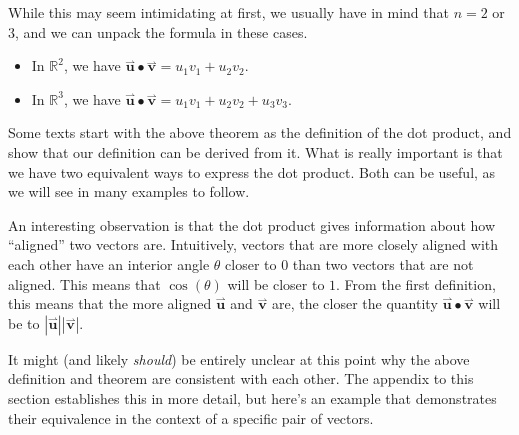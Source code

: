 \documentclass{ximera}
\begin{document}
While this may seem intimidating at first, we usually have in mind that $n=2$ or $3$, and we can unpack the formula in these cases.  

\begin{itemize}
\item In $\mathbb{R}^2$, we have $\overset{\boldsymbol{\rightharpoonup}}{\mathbf{u}} \bullet \overset{\boldsymbol{\rightharpoonup}}{\mathbf{v}} = u_1v_1+u_2v_2$.
\item In $\mathbb{R}^3$, we have $\overset{\boldsymbol{\rightharpoonup}}{\mathbf{u}} \bullet\overset{\boldsymbol{\rightharpoonup}}{\mathbf{v}} = u_1v_1+u_2v_2+u_3v_3$.
\end{itemize}

Some texts start with the above theorem as the definition of the dot product, and show that our definition can be derived from it.  What is really important is that we have two equivalent ways to express the dot product.  Both can be useful, as we will see in many examples to follow.

\begin{remark}
An interesting observation is that the dot product gives information about how ``aligned'' two vectors are.  Intuitively, vectors that are more closely aligned with each other have an interior angle $\theta$ closer to $0$ than two vectors that are not aligned.  This means that $\cos(\theta)$ will be closer to $1$. From the first definition, this means that the more aligned $\overset{\boldsymbol{\rightharpoonup}}{\mathbf{u}}$ and $\overset{\boldsymbol{\rightharpoonup}}{\mathbf{v}}$ are, the closer the quantity $\overset{\boldsymbol{\rightharpoonup}}{\mathbf{u}} \bullet \overset{\boldsymbol{\rightharpoonup}}{\mathbf{v}}$ will be to $|\overset{\boldsymbol{\rightharpoonup}}{\mathbf{u}}||\overset{\boldsymbol{\rightharpoonup}}{\mathbf{v}}|$.
\end{remark}



It might (and likely \emph{should}) be entirely unclear at this point why the above definition and theorem are consistent with each other.  The appendix to this section establishes this in more detail, but here's an example that demonstrates their equivalence in the context of a specific pair of vectors.
\end{document}
